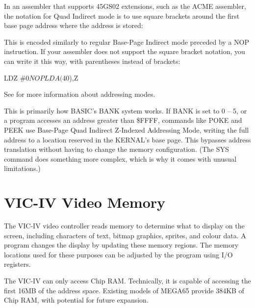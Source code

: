 In an assembler that supports 45GS02 extensions, such as the ACME assembler, the notation for Quad Indirect mode is to use square brackets around the first base page address where the address is stored:


This is encoded similarly to regular Base-Page Indirect mode preceded by a NOP instruction. If your assembler does not support the square bracket notation, you can write it this way, with parentheses instead of brackets:

\begin{asmcode}
LDZ #$0
NOP
LDA ($40),Z
\end{asmcode}

See  for more information about addressing modes.

This is primarily how BASIC's BANK system works. If BANK is set to 0 -- 5, or a program accesses an address greater than \$FFFF, commands like POKE and PEEK use Base-Page Quad Indirect Z-Indexed Addressing Mode, writing the full address to a location reserved in the KERNAL's base page. This bypasses address translation without having to change the memory configuration. (The SYS command does something more complex, which is why it comes with unusual limitations.)


\newpage
\section{VIC-IV Video Memory}

The VIC-IV video controller reads memory to determine what to display on the screen, including characters of text, bitmap graphics, sprites, and colour data. A program changes the display by updating these memory regions. The memory locations used for these purposes can be adjusted by the program using I/O registers.

The VIC-IV can only access Chip RAM. Technically, it is capable of accessing the first 16MB of the address space. Existing models of MEGA65 provide 384KB of Chip RAM, with potential for future expansion.

